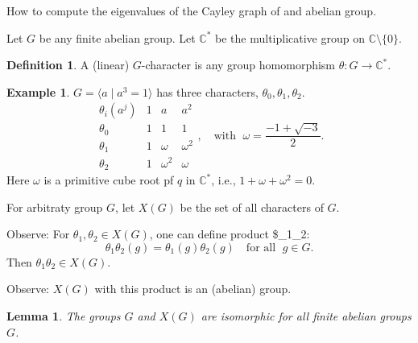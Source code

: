 \documentclass[
]{book}
\newtheorem{lemma}{Lemma}[chapter]
\theoremstyle{definition}
\newtheorem{definition}{Definition}[chapter]
\theoremstyle{definition}
\newtheorem{example}{Example}[chapter]
\theoremstyle{definition}
\theoremstyle{definition}
\theoremstyle{remark}
\begin{document}
How to compute the eigenvalues of the Cayley graph of and abelian group.

Let \(G\) be any finite abelian group. Let \(\mathbb{C}^*\) be the multiplicative group on \(\mathbb{C}\setminus \{0\}\).

\begin{definition}
A (linear) \(G\)-character is any group homomorphism \(\theta: G \to \mathbb{C}^*\).
\end{definition}

\begin{example}
\(G = \langle a\mid a^3 =1\rangle\) has three characters, \(\theta_0, \theta_1, \theta_2\).
\[
\begin{array}{c|ccc}
\theta_i(a^j) & 1 & a & a^2 \\
\hline
\theta_0 & 1 & 1 & 1\\
\theta_1 & 1 & \omega & \omega^2\\
\theta_2 & 1 & \omega^2 & \omega
\end{array}, \quad \textrm{with }\; \omega = \frac{-1+\sqrt{-3}}{2}.
\]
Here \(\omega\) is a primitive cube root pf \(q\) in \(\mathbb{C}^*\), i.e., \(1+\omega + \omega^2 = 0\).
\end{example}

For arbitraty group \(G\), let \(X(G)\) be the set of all characters of \(G\).

Observe: For \(\theta_1, \theta_2\in X(G)\), one can define product \$\theta\_1\theta\_2:
\[\theta_1\theta_2(g) = \theta_1(g)\theta_2(g) \quad \textrm{for all }\; g\in G.\]
Then \(\theta_1\theta_2\in X(G)\).

Observe: \(X(G)\) with this product is an (abelian) group.

\begin{lemma}
\protect\hypertarget{lem:charactergroup}{}\label{lem:charactergroup}The groups \(G\) and \(X(G)\) are isomorphic for all finite abelian groups \(G\).
\end{lemma}
\end{document}

